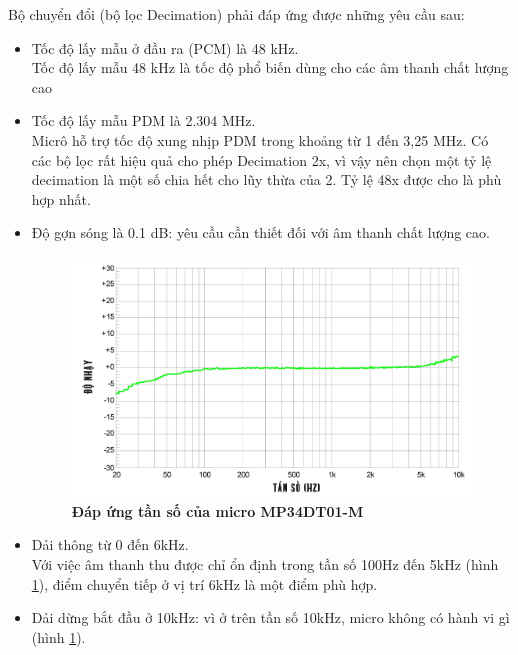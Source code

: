 Bộ chuyển đổi (bộ lọc Decimation) phải đáp ứng được những yêu cầu sau:
\begin{itemize}
    \item Tốc độ lấy mẫu ở đầu ra (PCM) là 48 kHz.\\
    Tốc độ lấy mẫu 48 kHz là tốc độ phổ biến dùng cho các âm thanh chất lượng cao
    \item Tốc độ lấy mẫu PDM là 2.304 MHz.\\
    Micrô hỗ trợ tốc độ xung nhịp PDM trong khoảng từ 1 đến 3,25 MHz. Có các bộ lọc rất hiệu quả cho phép Decimation 2x, vì vậy nên chọn một tỷ lệ decimation là một số chia hết cho lũy thừa của 2. Tỷ lệ 48x được cho là phù hợp nhất.

    \item Độ gợn sóng là 0.1 dB: yêu cầu cần thiết đối với âm thanh chất lượng cao.

\begin{figure}[H]
    \centering
    \includegraphics[width=13cm]{Images/Chuong2/do_nhay.png}
    \caption[Đáp ứng tần số của micro MP34DT01-M]{\bfseries \fontsize{12pt}{0pt}\selectfont Đáp ứng tần số của micro MP34DT01-M}
    \label{do_nhay}
\end{figure}

    \item Dải thông từ 0 đến 6kHz.\\
    Với việc âm thanh thu được chỉ ổn định trong tần số 100Hz đến 5kHz (hình \ref{do_nhay}), điểm chuyển tiếp ở vị trí 6kHz là một điểm phù hợp.
    \item Dải dừng bắt đầu ở 10kHz: vì ở trên tần số 10kHz, micro không có hành vi gì (hình \ref{do_nhay}).

\end{itemize}

